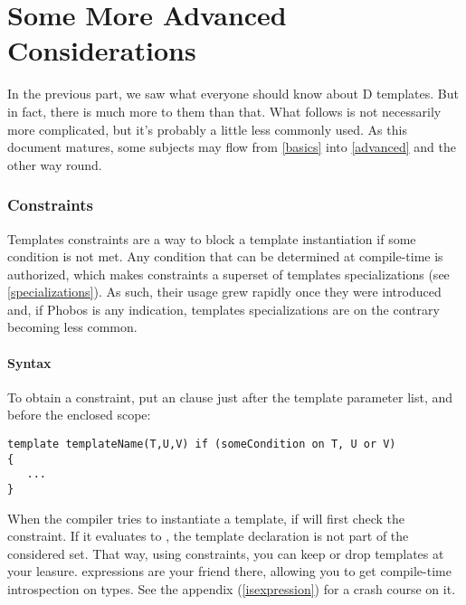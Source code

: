 \newpage
\part{Some More Advanced Considerations}\label{advanced} %

In the previous part, we saw what everyone should know about D templates. But in fact, there is much more to them than that. What follows is not necessarily more complicated, but it's probably a little less commonly used. As this document matures, some subjects may flow from \autoref{basics} into \autoref{advanced} and the other way round.

\section{Constraints}\label{constraints}

Templates constraints are a way to block a template instantiation if some condition is not met. Any condition that can be determined at compile-time is authorized, which makes constraints a superset of templates specializations (see \ref{specializations}). As such, their usage grew rapidly once they were introduced and, if Phobos is any indication, templates specializations are on the contrary becoming less common.

\subsection{Syntax}\label{constraintssyntax}

To obtain a constraint, put an  clause just after the template parameter list, and before the enclosed scope:

\begin{verbatim}
template templateName(T,U,V) if (someCondition on T, U or V)
{
   ...
}
\end{verbatim}

When the compiler tries to instantiate a template, if will first check the constraint. If it evaluates to , the template declaration is not part of the considered set. That way, using constraints, you can keep or drop templates at your leasure.  expressions are your friend there, allowing you to get compile-time introspection on types. See the appendix (\ref{isexpression}) for a crash course on it. 

